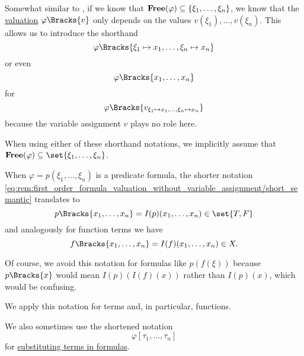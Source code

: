 \begin{remark}\label{rem:first_order_formula_valuation_without_variable_assignment}
  Somewhat similar to , if we know that \( \operatorname{\mathbf{Free}}(\varphi) \subseteq \{ \xi_1, \ldots, \xi_n \} \), we know that the \hyperref[def:first_order_valuation/formula_valuation]{valuation} \( \varphi\Bracks{v} \) only depends on the values \( v(\xi_1), \ldots, v(\xi_n) \). This allows us to introduce the shorthand
  \begin{equation}\label{eq:rem:first_order_formula_valuation_without_variable_assignment/long_semantic}
    \varphi\Bracks{\xi_1 \mapsto x_1, \ldots, \xi_n \mapsto x_n}
  \end{equation}
  or even
  \begin{equation}\label{eq:rem:first_order_formula_valuation_without_variable_assignment/short_semantic}
    \varphi\Bracks{x_1, \ldots, x_n}
  \end{equation}
  for
  \begin{equation*}
    \varphi\Bracks{v_{\xi_1 \mapsto x_1, \ldots, \xi_n \mapsto x_n}}
  \end{equation*}
  because the variable assignment \( v \) plays no role here.

  When using either of these shorthand notations, we implicitly assume that \( \boldop{Free}(\varphi) \subseteq \set{ \xi_1, \ldots, \xi_n } \).

  When \( \varphi = p(\xi_1, \ldots, \xi_n) \) is a predicate formula, the shorter notation \eqref{eq:rem:first_order_formula_valuation_without_variable_assignment/short_semantic} translates to
  \begin{equation*}
    p\Bracks{x_1, \ldots, x_n} = I(p)(x_1, \ldots, x_n) \in \set{ T, F }
  \end{equation*}
  and analogously for function terms we have
  \begin{equation*}
    f\Bracks{x_1, \ldots, x_n} = I(f)(x_1, \ldots, x_n) \in X.
  \end{equation*}

  Of course, we avoid this notation for formulas like \( p(f(\xi)) \) because \( p\Bracks{x} \) would mean \( I(p)(I(f)(x)) \) rather than \( I(p)(x) \), which would be confusing.

  We apply this notation for terms and, in particular, functions.

  We also sometimes use the shortened notation
  \begin{equation}\label{eq:rem:first_order_formula_valuation_without_variable_assignment/short_syntactic}
    \varphi[\tau_1, \ldots, \tau_n]
  \end{equation}
  for \hyperref[def:first_order_substitution/term_in_formula]{substituting terms in formulas}.
\end{remark}


